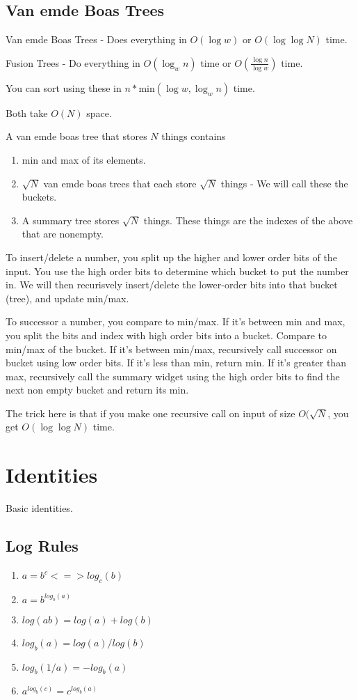 \documentclass[8pt,twocolumn]{article}
\begin{document}
\subsection{Van emde Boas Trees}

Van emde Boas Trees - Does everything in $O(\log w)$ or $O(\log \log N)$ time.

Fusion Trees - Do everything in $O(\log_{w}{n})$ time or $O(\frac{\log{n}}{\log{w}})$ time.

You can sort using these in $n * $min$(\log w, \log_{w}{n})$ time.

Both take $O(N)$ space.

A van emde boas tree that stores $N$ things contains
\begin{enumerate}
    \item min and max of its elements.
    \item $\sqrt{N}$ van emde boas trees that each store $\sqrt{N}$ things - We will call these the buckets.
    \item A summary tree stores $\sqrt{N}$ things. These things are the indexes of the above that are nonempty.
\end{enumerate}

To insert/delete a number, you split up the higher and lower order bits of the input. You use the high order bits to determine which bucket to put the number in. We will then recurisvely insert/delete the lower-order bits into that bucket (tree), and update min/max.

To successor a number, you compare to min/max. If it's between min and max, you split the bits and index with high order bits into a bucket. Compare to min/max of the bucket. If it's between min/max, recursively call successor on bucket using low order bits. If it's less than min, return min. If it's greater than max, recursively call the summary widget using the high order bits to find the next non empty bucket and return its min.

The trick here is that if you make one recursive call on input of size $O(\sqrt{N}$, you get $O(\log \log N)$ time.

\section{ Identities }
Basic identities.
\subsection{ Log Rules }
\begin{enumerate}
    \item $a = b^c <=> log_c(b)$
    \item $a = b^{log_b(a)}$
    \item $log(a b) = log(a) + log(b)$
    \item $log_b(a) = log(a)/log(b)$
    \item $log_b(1/a) = -log_b(a)$
    \item $a^{log_b(c)} = c^{log_b(a)}$
    \end{enumerate}
\end{document}
